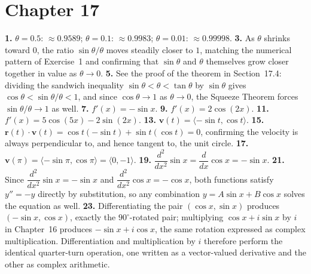 \section*{Chapter 17}
\textbf{1.} $\theta=0.5$: $\approx0.9589$; $\theta=0.1$: $\approx0.9983$;
$\theta=0.01$: $\approx0.99998$. \quad
\textbf{3.} As $\theta$ shrinks toward $0$, the ratio $\sin\theta/\theta$
moves steadily closer to $1$, matching the numerical pattern of
Exercise~1 and confirming that $\sin\theta$ and $\theta$ themselves grow
closer together in value as $\theta\to0$. \quad
\textbf{5.} See the proof of the theorem in Section~17.4: dividing the
sandwich inequality $\sin\theta<\theta<\tan\theta$ by $\sin\theta$ gives
$\cos\theta < \sin\theta/\theta < 1$, and since $\cos\theta\to1$ as
$\theta\to0$, the Squeeze Theorem forces $\sin\theta/\theta\to1$ as well.
\quad
\textbf{7.} $f'(x) = -\sin x$. \quad
\textbf{9.} $f'(x) = 2\cos(2x)$. \quad
\textbf{11.} $f'(x) = 5\cos(5x) - 2\sin(2x)$. \quad
\textbf{13.} $\mathbf{v}(t) = \langle -\sin t, \cos t\rangle$. \quad
\textbf{15.} $\mathbf{r}(t)\cdot\mathbf{v}(t) = \cos t(-\sin t) + \sin
t(\cos t) = 0$, confirming the velocity is always perpendicular to, and
hence tangent to, the unit circle. \quad
\textbf{17.} $\mathbf{v}(\pi) = \langle -\sin\pi, \cos\pi\rangle =
\langle 0,-1\rangle$. \quad
\textbf{19.} $\dfrac{d^2}{dx^2}\sin x = \dfrac{d}{dx}\cos x = -\sin x$.
\quad
\textbf{21.} Since $\dfrac{d^2}{dx^2}\sin x=-\sin x$ and
$\dfrac{d^2}{dx^2}\cos x=-\cos x$, both functions satisfy $y''=-y$
directly by substitution, so any combination $y=A\sin x+B\cos x$ solves
the equation as well. \quad
\textbf{23.} Differentiating the pair $(\cos x,\sin x)$ produces
$(-\sin x,\cos x)$, exactly the $90^\circ$-rotated pair; multiplying
$\cos x+i\sin x$ by $i$ in Chapter~16 produces $-\sin x+i\cos x$, the
same rotation expressed as complex multiplication. Differentiation and
multiplication by $i$ therefore perform the identical quarter-turn
operation, one written as a vector-valued derivative and the other as
complex arithmetic.

